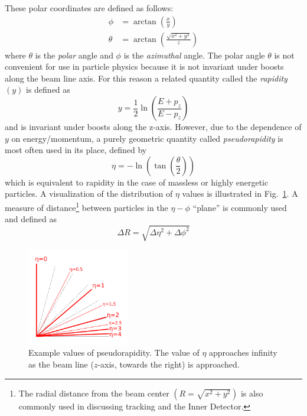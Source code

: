 These polar coordinates are defined as follows:
\begin{align}
\phi &= \arctan\left( {\frac{x}{y}} \right) \\
\theta &= \arctan \left( {\frac{\sqrt{x^2+y^2}}{z}} \right)
\label{eqn:polar_coordinates}
\end{align}
where $\theta$ is the \textit{polar} angle and $\phi$ is the \textit{azimuthal} angle.
The polar angle $\theta$ is not convenient for use in particle physics because it is not invariant under boosts along the beam line axis. For this reason a related quantity called the \textit{rapidity} $(y)$ is defined as
\begin{equation}
y = \frac{1}{2} \ln \left( \frac{E + p_z}{E-p_z} \right)
\label{eqn:rapidity}
\end{equation}
and is invariant under boosts along the z-axis. However, due to the dependence of $y$ on energy/momentum, a purely geometric quantity called \textit{pseudorapidity} is most often used in its place, defined by
\begin{equation}
\eta = -\ln \left(\tan\left( \frac{\theta}{2} \right) \right)
\label{eqn:pseudorapidity}
\end{equation}
which is equivalent to rapidity in the case of massless or highly energetic particles.
A visualization of the distribution of $\eta$ values is illustrated in Fig.~\ref{fig:pseudorapidity}.
A measure of distance\footnote{The radial distance from the beam center $\left(R = \sqrt{x^2 + y^2}\right)$ is also commonly used in discussing tracking and the Inner Detector.} between particles in the $\eta-\phi$ ``plane'' is commonly used and defined as
\begin{equation}
\Delta R = \sqrt{\Delta \eta^2 + \Delta \phi^2}
\label{eqn:deltaR}
\end{equation}

\begin{figure}
	\centering
	\includegraphics[width=0.4\textwidth]{pseudorapidity}
	\caption{Example values of pseudorapidity. The value of $\eta$ approaches infinity as the beam line ($z$-axis, towards the right) is approached. }
	\label{fig:pseudorapidity}
\end{figure}

